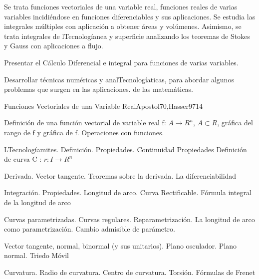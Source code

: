 \begin{syllabus}


\begin{justification}
Se trata funciones vectoriales de una variable real, funciones reales de varias variables incidiéndose en funciones diferenciables y sus aplicaciones. Se estudia las integrales múltiples con aplicación a obtener áreas y volúmenes.
Asimismo, se trata integrales de lTecnologíanea y superficie analizando los teoremas de Stokes y Gauss con aplicaciones a flujo.
\end{justification}

\begin{goals}
\item  Presentar el Cálculo Diferencial e integral para funciones de varias variables.
\item  Desarrollar técnicas numéricas y analTecnologíaticas, para abordar algunos problemas que surgen en las aplicaciones. de las matemáticas.
\end{goals}

\begin{outcomes}
\end{outcomes}

\begin{unit}{Funciones Vectoriales de una Variable Real}{Apostol70,Hasser97}{14}
   \begin{topics}
	\item  Definición de una función vectorial de variable real f: $A \rightarrow R^n$, $A \subset R$, gráfica del rango de f y gráfica de f. Operaciones con funciones.
	\item LTecnologíamites. Definición. Propiedades. Continuidad  Propiedades Definición de curva C : $r : I \rightarrow R^n$
	\item  Derivada. Vector tangente. Teoremas sobre la derivada. La diferenciabilidad
	\item  Integración. Propiedades. Longitud de arco. Curva Rectificable. Fórmula integral de la longitud de arco
	\item  Curvas parametrizadas. Curvas regulares. Reparametrización. La longitud de arco como parametrización. Cambio admisible de parámetro.
	\item  Vector tangente, normal, binormal (y sus unitarios). Plano osculador. Plano normal. Triedo Móvil
	\item Curvatura. Radio de curvatura.  Centro de curvatura. Torsión. Fórmulas de Frenet
   \end{topics}


\end{unit}
\end{syllabus}
